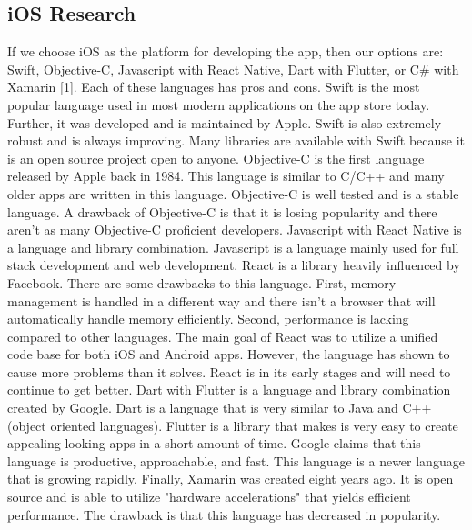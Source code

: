\documentclass[onecolumn, draftclsnofoot,10pt, journal, letterpaper]{IEEEtran}
\begin{document}
    \subsection{iOS Research}
        If we choose iOS as the platform for developing the app, then our options are: Swift, Objective-C, Javascript with React Native, Dart with Flutter, or C\# with Xamarin [1]. Each of these languages has pros and cons. Swift is the most popular language used in most modern applications on the app store today. Further, it was developed and is maintained by Apple. Swift is also extremely robust and is always improving. Many libraries are available with Swift because it is an open source project open to anyone. Objective-C is the first language released by Apple back in 1984. This language is similar to C/C++ and many older apps are written in this language. Objective-C is well tested and is a stable language. A drawback of Objective-C is that it is losing popularity and there aren't as many Objective-C proficient developers. Javascript with React Native is a language and library combination. Javascript is a language mainly used for full stack development and web development. React is a library heavily influenced by Facebook. There are some drawbacks to this language. First, memory management is handled in a different way and there isn't a browser that will automatically handle memory efficiently. Second, performance is lacking compared to other languages. The main goal of React was to utilize a unified code base for both iOS and Android apps. However, the language has shown to cause more problems than it solves. React is in its early stages and will need to continue to get better. Dart with Flutter is a language and library combination created by Google. Dart is a language that is very similar to Java and C++ (object oriented languages). Flutter is a library that makes is very easy to create appealing-looking apps in a short amount of time. Google claims that this language is productive, approachable, and fast. This language is a newer language that is growing rapidly. Finally, Xamarin was created eight years ago. It is open source and is able to utilize "hardware accelerations" that yields efficient performance. The drawback is that this language has decreased in popularity.
    
\end{document}
